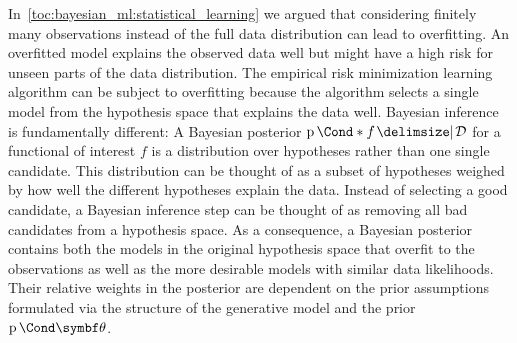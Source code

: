 In~\cref{toc:bayesian_ml:statistical_learning} we argued that considering finitely many observations instead of the full data distribution can lead to overfitting.
An overfitted model explains the observed data well but might have a high risk for unseen parts of the data distribution.
The empirical risk minimization learning algorithm can be subject to overfitting because the algorithm selects a single model from the hypothesis space that explains the data well.
Bayesian inference is fundamentally different:
A Bayesian posterior $\Prob*{f \given \Dc}$ for a functional of interest $f$ is a distribution over hypotheses rather than one single candidate.
This distribution can be thought of as a subset of hypotheses weighed by how well the different hypotheses explain the data.
Instead of selecting a good candidate, a Bayesian inference step can be thought of as removing all bad candidates from a hypothesis space.
As a consequence, a Bayesian posterior contains both the models in the original hypothesis space that overfit to the observations as well as the more desirable models with similar data likelihoods.
Their relative weights in the posterior are dependent on the prior assumptions formulated via the structure of the generative model and the prior $\Prob{\mat{\theta}}$.


